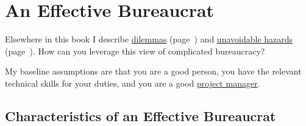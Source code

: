 \section{An Effective Bureaucrat\label{sec:effective-bureaucrat}}

Elsewhere in this book I describe 
\hyperref[sec:dilemma-trilemma]{dilemmas} 
(page~\pageref{sec:dilemma-trilemma}) 
and 
\hyperref[sec:unavoidable-hazards]{unavoidable hazards}
(page~\pageref{sec:unavoidable-hazards}). 
How can you leverage this view of complicated bureaucracy?

My baseline assumptions are that you are a good person, you have the relevant technical skills for your duties, and you are a good \href{https://en.wikipedia.org/wiki/Project_management}{project manager}. 

\subsection*{Characteristics of an Effective Bureaucrat}

